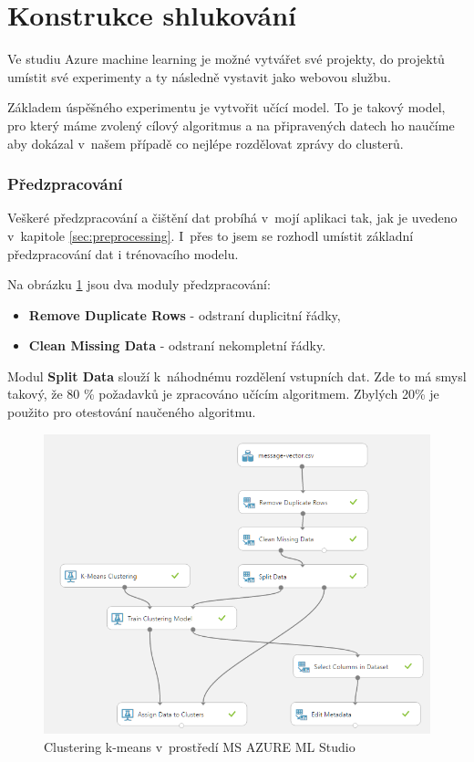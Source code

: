 \documentclass[thesis=M,czech]{FITthesis}[2012/10/20]
\newcommand{\tmpframe}[1]{\fbox{#1}}
\renewcommand{\tmpframe}[1]{#1}
\begin{document}
		
	\section{Konstrukce shlukování}
		\label{sec:construc_clustering}		
		Ve studiu Azure machine learning je možné vytvářet své projekty, do projektů umístit své experimenty a ty následně vystavit jako webovou službu.
		
		Základem úspěšného experimentu je vytvořit učící model. To je takový model, pro který máme zvolený cílový algoritmus a na připravených datech ho naučíme aby dokázal v~našem případě co nejlépe rozdělovat zprávy do clusterů.
		
		\subsubsection{Předzpracování}
		Veškeré předzpracování a čištění dat probíhá v~mojí aplikaci tak, jak je uvedeno v~kapitole \ref{sec:preprocessing}. I~přes to jsem se rozhodl umístit základní předzpracování dat i trénovacího modelu.
		
		Na obrázku \ref{fig:k-means_azure} jsou dva moduly předzpracování:
		
		\begin{itemize} 
			\item \textbf{Remove Duplicate Rows} - odstraní duplicitní řádky,
			\item \textbf{Clean Missing Data} - odstraní nekompletní řádky.	
		\end{itemize}
	
		Modul \textbf{Split Data} slouží k~náhodnému rozdělení vstupních dat. Zde to má smysl takový, že 80 \% požadavků je zpracováno učícím algoritmem. Zbylých 20\% je použito pro otestování naučeného algoritmu. 
		
		\begin{figure}[htb]\centering
			\tmpframe{\includegraphics[width=\textwidth]{./img/azureTrainingKmeans}}	
			\caption{Clustering k-means v~prostředí MS AZURE ML Studio}
			\label{fig:k-means_azure}
		\end{figure}
	
\end{document}
